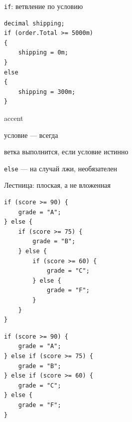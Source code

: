 \documentclass[aspectratio=169,10pt,t]{beamer}
\begin{document}
\begin{frame}[fragile]{\texttt{if}: ветвление по условию}
  \slidetop
  \begin{minipage}[t]{0.46\textwidth}
\begin{lstlisting}[style=csharp,basicstyle=\ttfamily\small]
decimal shipping;
if (order.Total >= 5000m)
{
    shipping = 0m;
}
else
{
    shipping = 300m;
}
\end{lstlisting}
  \end{minipage}\hfill
  \begin{minipage}[t]{0.48\textwidth}
    \vspace{0.2em}
    \begin{cbul}{accent}
      \item условие --- всегда 
      \item ветка выполнится, если условие истинно
      \item \texttt{else} --- на случай лжи, необязателен
    \end{cbul}
    \vspace{1.2em}
  \end{minipage}
\end{frame}

\begin{frame}[fragile]{Лестница: плоская, а не вложенная}
  \slidetop
  \begin{minipage}[t]{0.47\textwidth}
    \par\vspace{0.5em}
\begin{lstlisting}[style=csharp,basicstyle=\ttfamily\scriptsize]
if (score >= 90) {
    grade = "A";
} else {
    if (score >= 75) {
        grade = "B";
    } else {
        if (score >= 60) {
            grade = "C";
        } else {
            grade = "F";
        }
    }
}
\end{lstlisting}
  \end{minipage}\hfill
  \begin{minipage}[t]{0.47\textwidth}
    \par\vspace{0.5em}
\begin{lstlisting}[style=csharp,basicstyle=\ttfamily\scriptsize]
if (score >= 90) {
    grade = "A";
} else if (score >= 75) {
    grade = "B";
} else if (score >= 60) {
    grade = "C";
} else {
    grade = "F";
}
\end{lstlisting}
    \vspace{0.8em}
  \end{minipage}
\end{frame}
\end{document}
